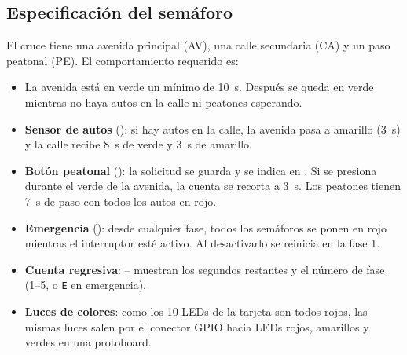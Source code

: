 \documentclass[12pt,letterpaper]{article}
\begin{document}
\subsection{Especificación del semáforo}
El cruce tiene una avenida principal (AV), una calle secundaria (CA) y un paso peatonal (PE). El
comportamiento requerido es:
\begin{itemize}[itemsep=0pt]
  \item La avenida está en verde un mínimo de 10~s. Después se queda en verde mientras no haya
        autos en la calle ni peatones esperando.
  \item \textbf{Sensor de autos} (): si hay autos en la calle, la avenida pasa a
        amarillo (3~s) y la calle recibe 8~s de verde y 3~s de amarillo.
  \item \textbf{Botón peatonal} (): la solicitud se guarda y se indica en
        . Si se presiona durante el verde de la avenida, la cuenta se recorta a
        3~s. Los peatones tienen 7~s de paso con todos los autos en rojo.
  \item \textbf{Emergencia} (): desde cualquier fase, todos los semáforos se ponen en
        rojo mientras el interruptor esté activo. Al desactivarlo se reinicia en la fase 1.
  \item \textbf{Cuenta regresiva}: -- muestran los segundos restantes y
         el número de fase (1--5, o \texttt{E} en emergencia).
  \item \textbf{Luces de colores}: como los 10 LEDs de la tarjeta son todos rojos, las mismas
        luces salen por el conector GPIO hacia LEDs rojos, amarillos y verdes en una protoboard.
\end{itemize}
\end{document}
